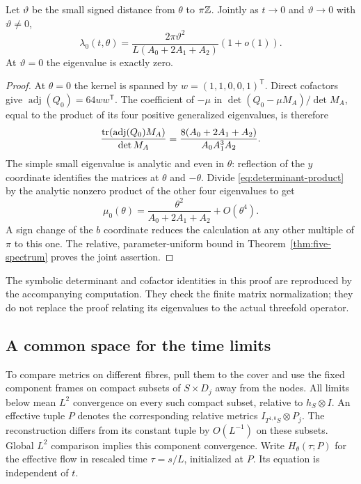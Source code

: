 \begin{corollary}\label{cor:weakest-rate}
Let $\vartheta$ be the small signed distance from $\theta$ to
$\pi\mathbb Z$. Jointly as $t\to0$ and $\vartheta\to0$ with
$\vartheta\ne0$,
\begin{equation}\label{eq:weakest-rate}
 \lambda_0(t,\theta)=
 \frac{2\pi\vartheta^2}{L(A_0+2A_1+A_2)}(1+o(1)).
\end{equation}
At $\vartheta=0$ the eigenvalue is exactly zero.
\end{corollary}
\begin{proof}
At $\theta=0$ the kernel is spanned by
$w=(1,1,0,0,1)^{\mathsf T}$. Direct cofactors give
$\operatorname{adj}(Q_0)=64ww^{\mathsf T}$.
The coefficient of $-\mu$ in
$\det(Q_0-\mu M_A)/\det M_A$, equal to the product of its four
positive generalized eigenvalues, is therefore
\[
 \frac{\operatorname{tr}(\operatorname{adj}(Q_0)M_A)}{\det M_A}
       =\frac{8(A_0+2A_1+A_2)}{A_0A_1^3A_2}.
\]
The simple small eigenvalue is analytic and even in $\theta$:
reflection of the $y$ coordinate identifies the matrices at
$\theta$ and $-\theta$. Divide \eqref{eq:determinant-product}
by the analytic nonzero product of the other four eigenvalues to get
\[
 \mu_0(\theta)=\frac{\theta^2}{A_0+2A_1+A_2}+O(\theta^4).
\]
A sign change of the $b$ coordinate reduces the calculation at any
other multiple of $\pi$ to this one. The relative, parameter-uniform
bound in Theorem~\ref{thm:five-spectrum} proves the joint assertion.
\end{proof}

The symbolic determinant and cofactor identities in this proof are
reproduced by the accompanying computation. They check the finite
matrix normalization; they do not replace the proof relating its
eigenvalues to the actual threefold operator.

\subsection{A common space for the time limits}
To compare metrics on different fibres, pull them to the cover and use
the fixed component frames on compact subsets of $S\times D_j$
away from the nodes. All limits below mean $L^2$ convergence on every
such compact subset, relative to $h_S\otimes I$.
An effective tuple $P$ denotes the corresponding relative metrics
$I_{T^{1,0}S}\otimes P_j$. The reconstruction differs from its
constant tuple by $O(L^{-1})$ on these subsets. Global $L^2$
comparison implies this component convergence.
Write $H_\theta(\tau;P)$ for the effective flow in rescaled time
$\tau=s/L$, initialized at $P$. Its equation is independent of $t$.

